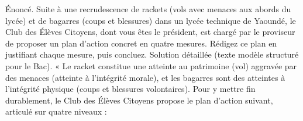 \documentclass[11pt]{article}
\newcommand{\cle}[1]{{\popxbold\color{popdark}#1}}
\begin{document}
\begin{exoresolu}
Énoncé. Suite à une recrudescence de rackets (vols avec menaces aux abords du lycée) et de bagarres (coups et blessures) dans un lycée technique de Yaoundé, le Club des Élèves Citoyens, dont vous êtes le président, est chargé par le proviseur de proposer un plan d'action concret en quatre mesures. Rédigez ce plan en justifiant chaque mesure, puis concluez.
\tcblower
Solution détaillée (texte modèle structuré pour le Bac).
« Le racket constitue une \cle{atteinte au patrimoine} (vol) aggravée par des \cle{menaces} (atteinte à l'intégrité morale), et les bagarres sont des \cle{atteintes à l'intégrité physique} (coups et blessures volontaires). Pour y mettre fin durablement, le Club des Élèves Citoyens propose le plan d'action suivant, articulé sur quatre niveaux :


\end{exoresolu}
\end{document}
